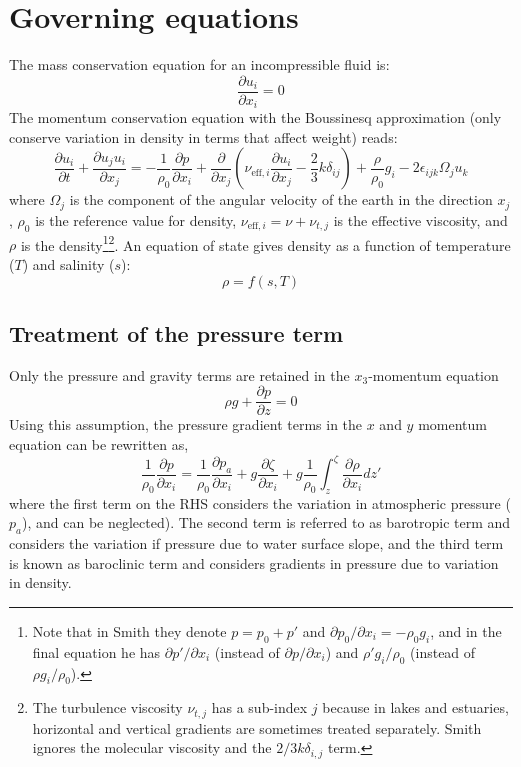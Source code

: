 \section{Governing equations}
The mass conservation equation for an incompressible fluid is:
\begin{equation}
    \frac{\partial u_i}{\partial x_i} = 0
    \label{eq:continuity}
\end{equation}
The momentum conservation equation with the Boussinesq approximation (only conserve variation in density in terms that affect weight) reads:
\begin{equation}
    \frac{\partial u_i}{\partial t} +  \frac{\partial u_ju_i}{\partial x_j} = -\frac{1}{\rho_0} \frac{\partial p}{\partial x_i} + \frac{\partial}{\partial x_j}\left( \nu_{\text{eff},i} \frac{\partial u_i}{\partial x_j}-\frac{2}{3}k \delta_{ij}\right) + \frac{\rho}{\rho_0}g_i - 2\epsilon_{ijk} \Omega_j u_k
    \label{eq:momentum}
\end{equation}
where $\Omega_j$ is the component of the angular velocity of the earth in the direction $x_j$, $\rho_0$ is the reference value for density, $\nu_{\text{eff},i}=\nu+\nu_{t,j}$ is the effective viscosity, and $\rho$ is the density\footnote{Note that in Smith they denote $p=p_0+p'$ and $\partial p_0/\partial x_i=-\rho_0g_i$, and in the final equation he has $\partial p' / \partial x_i$ (instead of $\partial p / \partial x_i$) and $\rho' g_i / \rho_0$ (instead of $\rho g_i / \rho_0$).}\footnote{The turbulence viscosity $\nu_{t,j}$ has a sub-index $j$ because in lakes and estuaries, horizontal and vertical gradients are sometimes treated separately. Smith ignores the molecular viscosity and the $2/3k\delta_{i,j}$ term.}. An equation of state gives density as a function of temperature ($T$) and salinity ($s$):
\begin{equation}
    \rho = f(s,T)
\end{equation}

\subsection{Treatment of the pressure term}
Only the pressure and gravity terms are retained in the $x_3$-momentum equation
\begin{equation}
    \rho g +\frac{\partial p}{\partial z} = 0
\end{equation}
Using this assumption, the pressure gradient terms in the $x$ and $y$ momentum equation can be rewritten as,
\begin{equation}
    \frac{1}{\rho_0} \frac{\partial p}{\partial x_i} = \frac{1}{\rho_0} \frac{\partial p_a}{\partial x_i} + g \frac{\partial \zeta}{\partial x_i} + g \frac{1}{\rho_0} \int_z^\zeta \frac{\partial \rho}{\partial x_i} dz'
\end{equation}
where the first term on the RHS considers the variation in atmospheric pressure ($p_a$), and can be neglected). The second term is referred to as barotropic term and considers the variation if pressure due to water surface slope, and the third term is known as baroclinic term and considers gradients in pressure due to variation in density. 

